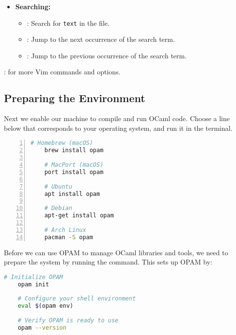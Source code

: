 \begin{Def}
\begin{itemize}
    \item \textbf{Searching:}
        \begin{itemize}
            \item {}: Search for \texttt{text} in the file.
            \item {}: Jump to the next occurrence of the search term.
            \item {}: Jump to the previous occurrence of the search term.
        \end{itemize}
\end{itemize}

\vspace{1em}
: for more Vim commands and options.
\end{Def}






\newpage


\vspace{-1em}
\subsection{Preparing the Environment}
\noindent
Next we enable our machine to compile and run OCaml code. Choose a line below that
corresponds to your operating system, and run it in the terminal.
\begin{lstlisting}[language=Bash, caption={Installing OPAM on Various Systems}, numbers=left]
    # Homebrew (macOS)
    brew install opam
    
    # MacPort (macOS)
    port install opam
    
    # Ubuntu
    apt install opam
    
    # Debian
    apt-get install opam
    
    # Arch Linux
    pacman -S opam
\end{lstlisting}

\noindent
Before we can use OPAM to manage OCaml libraries and tools, we need to prepare the system by running the  command. This sets up OPAM by:

\begin{lstlisting}[language=Bash, caption={Initializing OPAM}]
    # Initialize OPAM
    opam init
    
    # Configure your shell environment
    eval $(opam env)
    
    # Verify OPAM is ready to use
    opam --version
\end{lstlisting}


